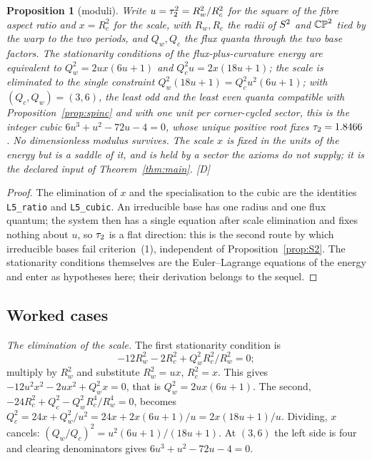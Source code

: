 \documentclass[11pt,a4paper]{article}
\theoremstyle{plain}
\newtheorem{proposition}[theorem]{Proposition}
\theoremstyle{definition}
\theoremstyle{remark}
\newcommand{\rigD}{[\textup{D}]}
\begin{document}
\begin{proposition}[moduli]\label{prop:moduli}
Write $u=\tau_2^{2}=R_{w}^{2}/R_{c}^{2}$ for the square of the fibre aspect ratio and $x=R_{c}^{2}$ for the scale, with $R_{w},R_{c}$ the radii of $S^2$ and $\mathbb{CP}^2$ tied by the warp to the two periods, and $Q_{w},Q_{c}$ the flux quanta through the two base factors. The stationarity conditions of the flux-plus-curvature energy are equivalent to $Q_{w}^{2}=2ux(6u+1)$ and $Q_{c}^{2}u=2x(18u+1)$; the scale is eliminated to the single constraint $Q_{w}^{2}(18u+1)=Q_{c}^{2}u^{2}(6u+1)$; with $(Q_{c},Q_{w})=(3,6)$, the least odd and the least even quanta compatible with Proposition~\ref{prop:spinc} and with one unit per corner-cycled sector, this is the integer cubic $6u^{3}+u^{2}-72u-4=0$, whose unique positive root fixes $\tau_2=1.8466$. No dimensionless modulus survives. The scale $x$ is fixed in the units of the energy but is a saddle of it, and is held by a sector the axioms do not supply; it is the declared input of Theorem~\ref{thm:main}. \rigD
\end{proposition}

\begin{proof}
The elimination of $x$ and the specialisation to the cubic are the identities \texttt{L5\_ratio} and \texttt{L5\_cubic}. An irreducible base has one radius and one flux quantum; the system then has a single equation after scale elimination and fixes nothing about $u$, so $\tau_2$ is a flat direction: this is the second route by which irreducible bases fail criterion~(1), independent of Proposition~\ref{prop:S2}. The stationarity conditions themselves are the Euler--Lagrange equations of the energy and enter as hypotheses here; their derivation belongs to the sequel.
\end{proof}

\subsection{Worked cases}\label{sec:theorem-worked}

\emph{The elimination of the scale.} The first stationarity condition is
\[
-12R_{w}^{2}-2R_{c}^{2}+Q_{w}^{2}R_{c}^{2}/R_{w}^{2}=0 ;
\]
multiply by $R_{w}^{2}$ and substitute $R_{w}^{2}=ux$, $R_{c}^{2}=x$. This gives $-12u^{2}x^{2}-2ux^{2}+Q_{w}^{2}x=0$, that is $Q_{w}^{2}=2ux(6u+1)$. The second, $-24R_{c}^{2}+Q_{c}^{2}-Q_{w}^{2}R_{c}^{4}/R_{w}^{4}=0$, becomes $Q_{c}^{2}=24x+Q_{w}^{2}/u^{2}=24x+2x(6u+1)/u=2x(18u+1)/u$. Dividing, $x$ cancels: $(Q_{w}/Q_{c})^{2}=u^{2}(6u+1)/(18u+1)$. At $(3,6)$ the left side is four and clearing denominators gives $6u^{3}+u^{2}-72u-4=0$.
\end{document}
